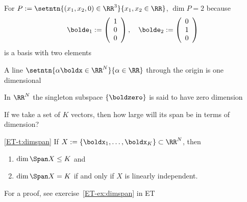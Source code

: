 \begin{frame}
    
    \vspace{2em}
    \Eg
    For $P := \setntn{(x_1, x_2, 0) \in \RR^3}{ x_1, x_2 \in \RR}$, $\dim P = 2$ because 
    \begin{equation*}
        \bolde_1 := 
        \left(
        \begin{array}{c}
            1 \\
            0 \\
            0
        \end{array}
        \right),
        \quad 
        \bolde_2 := 
        \left(
        \begin{array}{c}
            0 \\
            1 \\
            0
        \end{array}
        \right)
    \end{equation*}
    is a basis with two elements
    
    \vspace{.7em}
    \Eg
    A line $\setntn{\alpha \boldx \in \RR^N}{\alpha \in \RR}$ through
    the origin is one dimensional
    
\end{frame}

\begin{frame}

    \vspace{2em}
    In $\RR^N$ the singleton subspace $\{\boldzero\}$ is said to have zero
    dimension

    If we take a set of $K$ vectors, then how large will its span be in terms
    of dimension?  
    
    \vspace{.7em}
    \Thm\eqref{ET-t:dimspan}
        If $X := \{\boldx_1,\ldots,\boldx_K\} \subset \RR^N$, then
        \begin{enumerate}
            \item $\dim \Span X \leq K$ and
            \item $\dim \Span X = K$ if and only if $X$ is linearly independent.
        \end{enumerate}
    For a proof, see exercise~\ref{ET-ex:dimspan} in ET
    
\end{frame}

